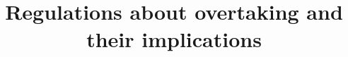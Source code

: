 

\subject{Midterm Report: Computational Physics Spring Term 2022}
\title{Regulations about overtaking and their implications}



\maketitle
\thispagestyle{empty}
\tableofcontents







\printbibliography{}


